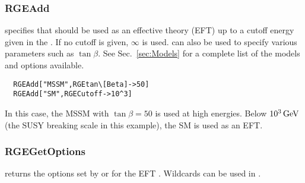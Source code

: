 \documentclass[10pt,a4paper,twoside]{scrartcl}
\begin{document}



\subsubsection{RGEAdd}

specifies that  should be used as an effective theory (EFT)
up to a cutoff energy given in the .  If no cutoff is
given, $\infty$ is used.   can also be used to specify
various parameters such as $\tan\beta$.  See Sec.~\ref{sec:Models} for a
complete list of the models and options available.

\begin{verbatim}
  RGEAdd["MSSM",RGEtan\[Beta]->50]
  RGEAdd["SM",RGECutoff->10^3]
\end{verbatim}
In this case, the MSSM with $\tan\beta=50$ is used at high energies.
Below $10^3\,\mathrm{GeV}$ (the SUSY breaking scale in this example), the SM is
used as an EFT.



\subsubsection{RGEGetOptions}

 returns the options set by
 or  for the EFT .
Wildcards can be used in .
 
\end{document}
